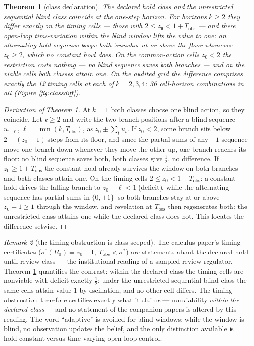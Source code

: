 \documentclass[10pt,twocolumn]{article}
\theoremstyle{plain}
\newtheorem{theorem}{Theorem}
\theoremstyle{definition}
\theoremstyle{remark}
\newtheorem{remark}[theorem]{Remark}
\begin{document}
\begin{theorem}[class declaration]\label{thm:class}
The declared hold class and the unrestricted sequential blind class
coincide at the one-step horizon. For horizons \(k \ge 2\) they differ
exactly on the timing cells --- those with
\(2 \le z_{0} < 1 + T_{\mathrm{obs}}\) --- and there open-loop
time-variation within the blind window lifts the value to one: an
alternating hold sequence keeps both branches at or above the floor
whenever \(z_{0} \ge 2\), which no constant hold does. On the
common-action cells \(z_{0} < 2\) the restriction costs nothing --- no
blind sequence saves both branches --- and on the viable cells both
classes attain one. On the audited grid the difference comprises exactly
the 12 timing cells at each of \(k = 2, 3, 4\): 36 cell-horizon
combinations in all (Figure \ref{fig:classdiff}).
\end{theorem}

\begin{proof}[Derivation of Theorem \ref{thm:class}]
At \(k = 1\) both classes choose one blind action, so they coincide. Let
\(k \ge 2\) and write the two branch positions after a blind sequence
\(u_{1:\ell}\), \(\ell = \min(k, T_{\mathrm{obs}})\), as
\(z_{0} \pm \sum_{t} u_{t}\). If \(z_{0} < 2\), some branch sits below
\(2 - (z_{0} - 1)\) steps from its floor, and since the partial sums of
any \(\pm1\)-sequence move one branch down whenever they move the other
up, one branch reaches its floor: no blind sequence saves both, both
classes give \(\tfrac{1}{2}\), no difference. If
\(z_{0} \ge 1 + T_{\mathrm{obs}}\) the constant hold already survives
the window on both branches and both classes attain one. On the timing
cells \(2 \le z_{0} < 1 + T_{\mathrm{obs}}\): a constant hold drives the
falling branch to \(z_{0} - \ell < 1\) (deficit), while the alternating
sequence has partial sums in \(\{0, \pm 1\}\), so both branches stay at
or above \(z_{0} - 1 \ge 1\) through the window, and revelation at
\(T_{\mathrm{obs}}\) then regenerates both: the unrestricted class
attains one while the declared class does not. This locates the
difference setwise.
\end{proof}

\begin{remark}[the timing obstruction is class-scoped]\label{rem:scope}
The calculus paper's timing certificates (\(\sigma^{*}(B_{0}) = z_{0} -
1\), \(T_{\mathrm{obs}} < \sigma^{*}\)) are statements about the declared
hold-until-review class --- the institutional reading of a sampled-review
regulator. Theorem \ref{thm:class} quantifies the contrast: within the
declared class the timing cells are nonviable with deficit exactly
\(\tfrac{1}{2}\); under the unrestricted sequential blind class the same
cells attain value \(1\) by oscillation, and no other cell differs. The
timing obstruction therefore certifies exactly what it claims ---
nonviability \emph{within the declared class} --- and no statement of the
companion papers is altered by this reading. The word ``adaptive'' is
avoided for blind windows: while the window is blind, no observation
updates the belief, and the only distinction available is hold-constant
versus time-varying open-loop control.
\end{remark}
\end{document}
